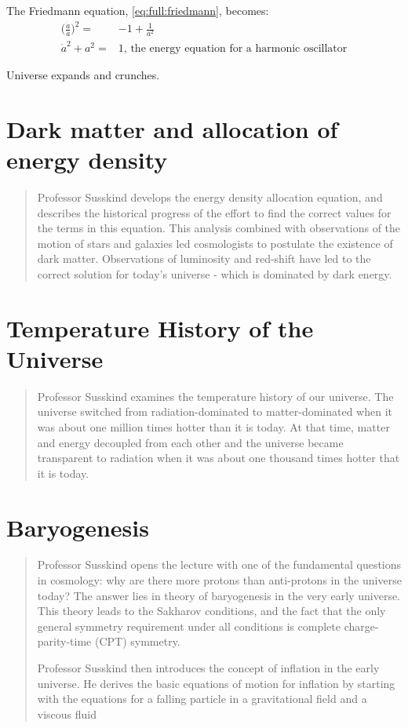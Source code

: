 \documentclass[]{article}
\begin{document}
 The Friedmann equation, \eqref{eq:full:friedmann}, becomes:
 \begin{align*}
 	\big(\frac{\dot{a}}{a}\big)^2  =& -1 + \frac{1}{a^2} \\
 	\dot{a}^2 + a^2 =&1 \text{, the energy equation for a harmonic oscillator}
 \end{align*}
 
 Universe expands and crunches.
 


\section{Dark matter and allocation of energy density}

\begin{quotation} 
	Professor Susskind develops the energy density allocation equation, and describes the historical progress of the effort to find the correct values for the terms in this equation.  This analysis combined with observations of the motion of stars and galaxies led cosmologists to postulate the existence of dark matter.  Observations of luminosity and red-shift have led to the correct solution for today's universe - which is dominated by dark energy.
\end{quotation}

\section{Temperature History of the Universe}

\begin{quotation}
	Professor Susskind examines the temperature history of our universe.  The universe switched from radiation-dominated to matter-dominated when it was about one million times hotter than it is today.  At that time, matter and energy decoupled from each other and the universe became transparent to radiation when it was about one thousand times hotter that it is today.
\end{quotation}

\section{Baryogenesis}

\begin{quotation}
	Professor Susskind opens the lecture with one of the fundamental questions in cosmology: why are there more protons than anti-protons in the universe today? The answer lies in theory of baryogenesis in the very early universe.  This theory leads to the Sakharov conditions, and the fact that the only general symmetry requirement under all conditions is complete charge-parity-time (CPT) symmetry.
	
	Professor Susskind then introduces the concept of inflation in the early universe.  He derives the basic equations of motion for inflation by starting with the equations for a falling particle in a gravitational field and a viscous fluid
\end{quotation}
\end{document}

